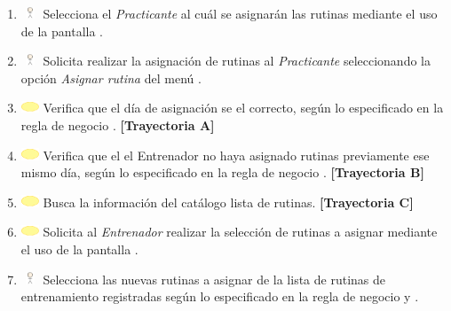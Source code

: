 \begin{enumerate}
	\item \includegraphics[width=15pt, height=10pt]{./Figuras/iconosCU/usuario.png} Selecciona el \textit{Practicante} al cuál se asignarán las rutinas mediante el uso de la pantalla .
	\item \includegraphics[width=15pt, height=10pt]{./Figuras/iconosCU/usuario.png} Solicita realizar la asignación de rutinas al \textit{Practicante} seleccionando la opción \textit{Asignar rutina} del menú .
	\item \includegraphics[width=15pt]{./Figuras/iconosCU/herramienta.png} Verifica que el día de asignación se el correcto, según lo especificado en la regla de negocio . \textbf{[Trayectoria A]}
	\item \includegraphics[width=15pt]{./Figuras/iconosCU/herramienta.png} Verifica que el el Entrenador no haya asignado rutinas previamente ese mismo día, según lo especificado en la regla de negocio . \textbf{[Trayectoria B]}
	\item \includegraphics[width=15pt]{./Figuras/iconosCU/herramienta.png} Busca la información del catálogo lista de rutinas. \textbf{[Trayectoria C]}
	\item \includegraphics[width=15pt]{./Figuras/iconosCU/herramienta.png} Solicita al \textit{Entrenador} realizar la selección de rutinas a asignar mediante el uso de la pantalla . 
	\item \includegraphics[width=15pt, height=10pt]{./Figuras/iconosCU/usuario.png} Selecciona las nuevas rutinas a asignar de la lista de rutinas de entrenamiento registradas según lo especificado en la regla de negocio  y .

\end{enumerate}
